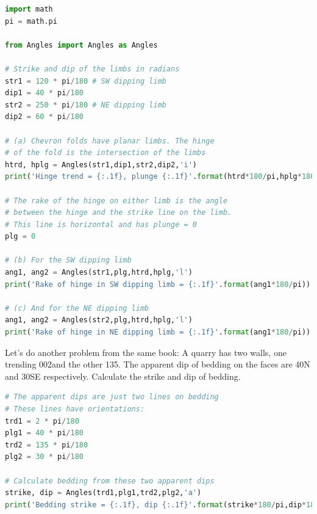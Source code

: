\documentclass[a4paper , 12pt]{book}
\begin{document}
\begin{center}
\begin{lstlisting}[language=Python, frame=single]
import math
pi = math.pi

from Angles import Angles as Angles

# Strike and dip of the limbs in radians
str1 = 120 * pi/180 # SW dipping limb
dip1 = 40 * pi/180
str2 = 250 * pi/180 # NE dipping limb
dip2 = 60 * pi/180

# (a) Chevron folds have planar limbs. The hinge
# of the fold is the intersection of the limbs
htrd, hplg = Angles(str1,dip1,str2,dip2,'i')
print('Hinge trend = {:.1f}, plunge {:.1f}'.format(htrd*180/pi,hplg*180/pi))

# The rake of the hinge on either limb is the angle 
# between the hinge and the strike line on the limb. 
# This line is horizontal and has plunge = 0
plg = 0

# (b) For the SW dipping limb
ang1, ang2 = Angles(str1,plg,htrd,hplg,'l')
print('Rake of hinge in SW dipping limb = {:.1f}'.format(ang1*180/pi))

# (c) And for the NE dipping limb
ang1, ang2 = Angles(str2,plg,htrd,hplg,'l')
print('Rake of hinge in NE dipping limb = {:.1f}'.format(ang1*180/pi))
\end{lstlisting}
\end{center}

Let's do another problem from the same book: A quarry has two walls, one trending 002\degree and the other 135\degree. The apparent dip of bedding on the faces are 40\degree N and 30\degree SE respectively. Calculate the strike and dip of bedding.

\begin{center}
\begin{lstlisting}[language=Python, frame=single]
# The apparent dips are just two lines on bedding
# These lines have orientations:
trd1 = 2 * pi/180
plg1 = 40 * pi/180
trd2 = 135 * pi/180
plg2 = 30 * pi/180

# Calculate bedding from these two apparent dips
strike, dip = Angles(trd1,plg1,trd2,plg2,'a')
print('Bedding strike = {:.1f}, dip {:.1f}'.format(strike*180/pi,dip*180/pi))
\end{lstlisting}
\end{center}
\end{document}
